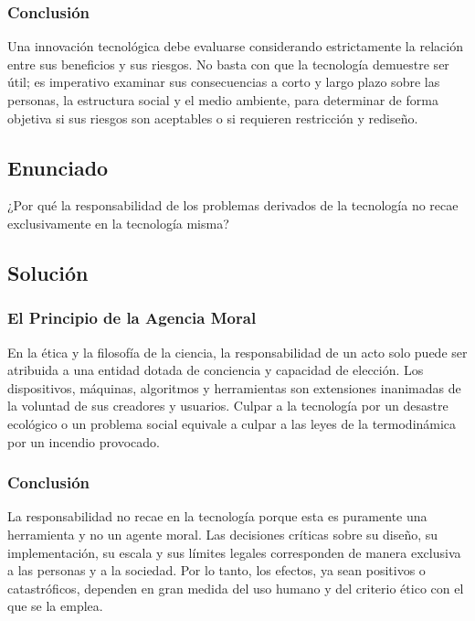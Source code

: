 \documentclass[12pt, a4paper]{article}
\begin{document}
\subsubsection*{Conclusión}
Una innovación tecnológica debe evaluarse considerando estrictamente la relación entre sus beneficios y sus riesgos. No basta con que la tecnología demuestre ser útil; es imperativo examinar sus consecuencias a corto y largo plazo sobre las personas, la estructura social y el medio ambiente, para determinar de forma objetiva si sus riesgos son aceptables o si requieren restricción y rediseño.

\newpage

\subsection*{Enunciado}
¿Por qué la responsabilidad de los problemas derivados de la tecnología no recae exclusivamente en la tecnología misma?

\subsection*{Solución}

\subsubsection*{El Principio de la Agencia Moral}
En la ética y la filosofía de la ciencia, la responsabilidad de un acto solo puede ser atribuida a una entidad dotada de conciencia y capacidad de elección. Los dispositivos, máquinas, algoritmos y herramientas son extensiones inanimadas de la voluntad de sus creadores y usuarios. Culpar a la tecnología por un desastre ecológico o un problema social equivale a culpar a las leyes de la termodinámica por un incendio provocado.

\subsubsection*{Conclusión}
La responsabilidad no recae en la tecnología porque esta es puramente una herramienta y no un agente moral. Las decisiones críticas sobre su diseño, su implementación, su escala y sus límites legales corresponden de manera exclusiva a las personas y a la sociedad. Por lo tanto, los efectos, ya sean positivos o catastróficos, dependen en gran medida del uso humano y del criterio ético con el que se la emplea.

\newpage
\end{document}
